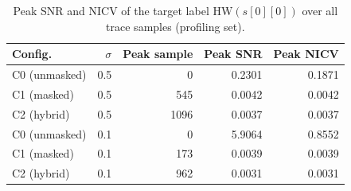 \begin{table}[t]\centering\caption{Peak SNR and NICV of the target label $\mathrm{HW}(s[0][0])$ over all trace samples (profiling set).}\label{tab:snr}
\begin{tabular}{lrrrr}\toprule Config. & $\sigma$ & Peak sample & Peak SNR & Peak NICV\\\midrule
C0 (unmasked) & 0.5 & 0 & 0.2301 & 0.1871\\
C1 (masked) & 0.5 & 545 & 0.0042 & 0.0042\\
C2 (hybrid) & 0.5 & 1096 & 0.0037 & 0.0037\\
C0 (unmasked) & 0.1 & 0 & 5.9064 & 0.8552\\
C1 (masked) & 0.1 & 173 & 0.0039 & 0.0039\\
C2 (hybrid) & 0.1 & 962 & 0.0031 & 0.0031\\
\bottomrule\end{tabular}\end{table}

